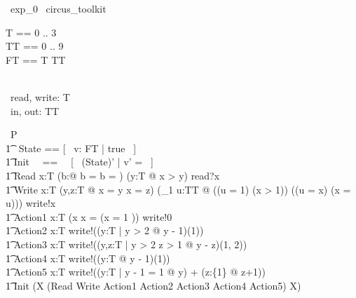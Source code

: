 
\begin{zsection}
  \SECTION\ exp\_0 \parents\ circus\_toolkit
\end{zsection}

\begin{zed}
	T == 0 .. 3 \\
	TT == 0 .. 9 \\
	FT == T \fun TT \\
    [NAME, PERSON] \\
\end{zed}

\begin{circus}
	\circchannel\ read, write: T\\
	\circchannel\ in, out: TT\\
\end{circus}

\begin{circus}
    \circprocess\ P \circdef \circbegin \\
        \t1 \circstate\ State == [~ v: FT | true ~] \\
        \t1 Init ~~==~~ [~ (State)' | v' = \emptyset ~] \\
        \t1 Read \circdef \circvar x:T \circspot \lcircguard (\exists b:\boolean @ b = \true \lor b = \false) \lor (\forall y:T @ x > y) \rcircguard \circguard read?x \then \Skip \\
        \t1 Write \circdef \circvar x:T \circspot \lcircguard \lnot (\exists y,z:T @ x = y \land x = z) \lor (\exists_1 u:TT @ ((u = 1) \implies (x > 1)) \land ((u = x) \iff (x = u))) \rcircguard \circguard write!x \then \Skip \\
        \t1 Action1 \circdef \circvar x:T \circspot \lcircguard  (x  \land x = (\IF x = 1  )) \rcircguard \circguard write!0 \then \Skip \\
        \t1 Action2 \circdef \circvar x:T \circspot write!((\lambda y:T | y > 2 @ y - 1)(1)) \then \Skip \\
        \t1 Action3 \circdef \circvar x:T \circspot write!((\lambda y,z:T | y > 2 \land z > 1 @ y - z)(1, 2)) \then \Skip \\
        \t1 Action4 \circdef \circvar x:T \circspot write!((\lambda y:T @ y - 1)(1)) \then \Skip \\
        \t1 Action5 \circdef \circvar x:T \circspot write!((\mu y:T | y - 1 = 1 @ y) + (\mu z:\{1\} @ z+1)) \then \Skip \\
        \t1 \circspot \lschexpract Init \rschexpract \circseq (\circmu X \circspot (Read \extchoice Write \extchoice Action1 \extchoice Action2 \extchoice Action3 \extchoice Action4 \extchoice Action5) \circseq X) \\ 
	\circend
\end{circus}

